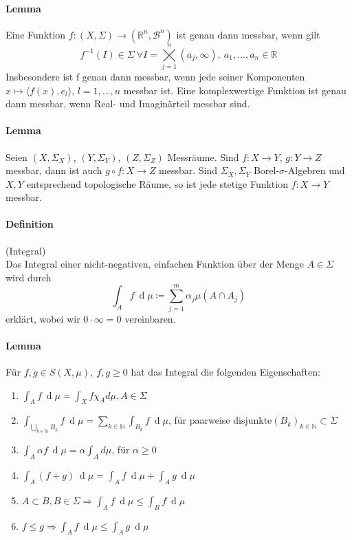 \documentclass[12pt,a4paper,fleqn]{article}
\def\d{{\operatorname{d}}}
\begin{document}
\paragraph{Lemma} Eine Funktion $f\colon (X, \Sigma)\rightarrow (\mathbb{R}^n, \mathcal{B}^n)$ ist genau dann messbar, wenn gilt
\begin{displaymath}
f^{-1} (I) \in \Sigma \ \forall I = \bigtimes\limits_{j = 1}^n (a_j, \infty),\ a_1, \dots, a_n \in \mathbb{R}
\end{displaymath}
Insbesondere ist f genau dann messbar, wenn jede seiner Komponenten $x \mapsto \langle f(x), e_l \rangle$, $l = 1, \dots, n$ messbar ist. Eine komplexwertige Funktion ist genau dann messbar, wenn Real- und Imaginärteil messbar sind.

\paragraph{Lemma} Seien $(X, \Sigma_X)$, $(Y, \Sigma_Y)$, $(Z, \Sigma_Z)$ Messräume. Sind $f\colon X \rightarrow Y$, ${g: Y \rightarrow Z}$ messbar, dann ist auch $g \circ f\colon X \rightarrow Z$ messbar. Sind $\Sigma_X, \Sigma_Y$ Borel-$\sigma$-Algebren und $X, Y$ entsprechend topologische Räume, so ist jede stetige Funktion $f\colon X \rightarrow Y$ messbar.

\paragraph{Definition} (Integral)\\
Das Integral einer nicht-negativen, einfachen Funktion über der Menge $A \in \Sigma$ wird durch
\begin{displaymath}
\int_A f\ \d\mu \coloneqq \sum \limits _{j = 1}^m \alpha_j \mu(A \cap A_j)
\end{displaymath}
erklärt, wobei wir $0 \cdot \infty = 0$ vereinbaren.

\paragraph{Lemma} Für $f, g \in S(X, \mu),\ f, g \geq 0$ hat das Integral die folgenden Eigenschaften:
\begin{enumerate}
\item$\int_A f\ \d\mu = \int_X f \chi_A d\mu, A \in \Sigma$
\item$\int_{\bigcup_{k \in \mathbb{N}}B_k}f\ \d\mu = \sum_{k \in \mathbb{N}} \int_{B_k} f\ \d\mu$, für paarweise disjunkte$(B_k)_{k \in \mathbb{N}} \subset \Sigma$
\item$\int_A \alpha f\ \d\mu = \alpha \int_A d\mu$, für $\alpha \geq 0$
\item$\int_A (f + g)\ \d\mu = \int_A f\ \d\mu + \int_A g\ \d\mu$
\item$A \subset B, B \in \Sigma \Rightarrow \int_A f\ \d\mu \leq \int_B f\ \d\mu$
\item$f \leq g \Rightarrow \int_A f\ \d\mu \leq \int_A g\ \d\mu$
\end{enumerate}
\end{document}
